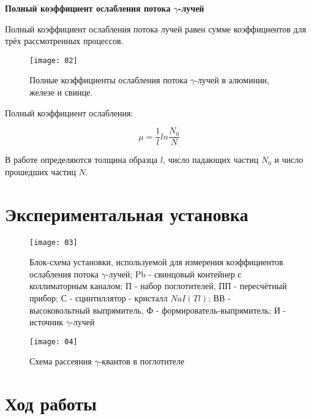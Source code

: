 \documentclass[letterpaper,12pt]{article}
\begin{document}
	   \vspace{0.5cm}
	 \textbf{  Полный коэффициент ослабления потока $\gamma$-лучей}
	 
	 
	 
	Полный коэффициент ослабления потока лучей равен сумме коэффициентов для трёх рассмотренных процессов. 
	
		\begin{figure}
		\centering
		{\texttt{[image: 02]}}
		\caption{Полные коэффициенты ослабления потока $\gamma$-лучей в алюминии, железе и свинце.}
	\end{figure}
	
 	Полный коэффициент ослабления:
 	
 	\begin{equation}
 	\mu=\frac{1}{l}ln\frac{N_0}{N}
 	\end{equation}
	
	В работе определяются толщина образца $l$, число падающих частиц $N_0$  и число прошедших частиц $N$.
	
	\section{Экспериментальная установка}
	
	
		\begin{figure} [h!]
			\centering
		{\texttt{[image: 03]}}
			\caption{Блок-схема установки, используемой для измерения коэффициентов ослабления потока $\gamma$-лучей; Pb - свинцовый контейнер с коллиматорным каналом; П - набор поглотителей, ПП - пересчётный прибор; С - сцинтиллятор - кристалл $NaI(Tl)$; ВВ - высоковольтный выпрямитель, Ф - формирователь-выпрямитель; И - источник $\gamma$-лучей}
		\end{figure}
\pagebreak
	\begin{figure} [h!]
		\centering
		{\texttt{[image: 04]}}
		\caption{Схема рассеяния $\gamma$-квантов в поглотителе}
	\end{figure}
			
	

	\section{Ход работы}
	
\end{document}
